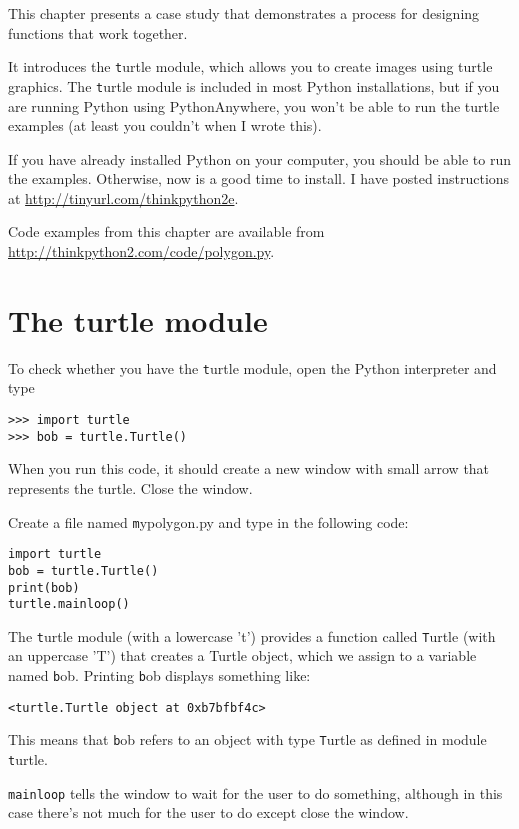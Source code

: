 \documentclass[
DIV=11,
fontsize=13,
twoside,
headinclude=false,
titlepage=firstiscover,
abstract=true,
headsepline=true,
footsepline=true,
chapterprefix=true, %
headings=big,
bibliography=totoc,%
captions=tableheading
]{scrbook}
\theoremstyle{definition}
\begin{document}
This chapter presents a case study that demonstrates a process for
designing functions that work together.

It introduces the {\texttt turtle} module, which allows you to
create images using turtle graphics.  The {\texttt turtle} module is
included in most Python installations, but if you are running Python
using PythonAnywhere, you won't be able to run the turtle examples (at
least you couldn't when I wrote this).

If you have already installed Python on your computer, you should
be able to run the examples.  Otherwise, now is a good time
to install.  I have posted instructions at
\url{http://tinyurl.com/thinkpython2e}.

Code examples from this chapter are available from
\url{http://thinkpython2.com/code/polygon.py}.


\section{The turtle module}
\label{turtle}

To check whether you have the {\texttt turtle} module, open the Python
interpreter and type

\begin{lstlisting}
>>> import turtle
>>> bob = turtle.Turtle()
\end{lstlisting}

When you run this code, it should create a new window
with small arrow that represents the turtle.  Close the window.

Create a file named {\texttt mypolygon.py} and type in the following
code:

\begin{lstlisting}
import turtle
bob = turtle.Turtle()
print(bob)
turtle.mainloop()
\end{lstlisting}
%
The {\texttt turtle} module (with a lowercase 't') provides a function
called {\texttt Turtle} (with an uppercase 'T') that creates a Turtle
object, which we assign to a variable named {\texttt bob}.
Printing {\texttt bob} displays something like:

\begin{lstlisting}
<turtle.Turtle object at 0xb7bfbf4c>
\end{lstlisting}
%
This means that {\texttt bob} refers to an object with type
{\texttt Turtle}
as defined in module {\texttt turtle}.

\verb"mainloop" tells the window to wait for the user
to do something, although in this case there's not much for
the user to do except close the window.
\end{document}
